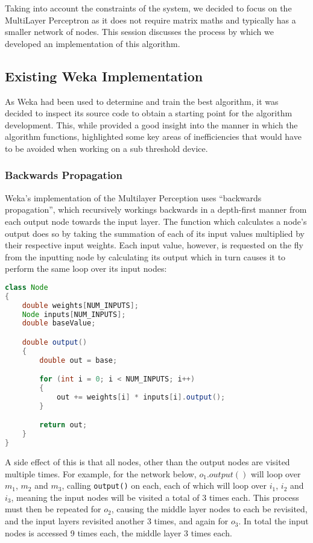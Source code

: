 
Taking into account the constraints of the system, we decided to focus on the MultiLayer Perceptron as it does not require matrix maths and typically has a smaller network of nodes. This session discusses the process by which we developed an implementation of this algorithm.

\subsection{Existing Weka Implementation}

As Weka had been used to determine and train the best algorithm, it was decided to inspect its source code to obtain a starting point for the algorithm development. This, while provided a good insight into the manner in which the algorithm functions, highlighted some key areas of inefficiencies that would have to be avoided when working on a sub threshold device.

\subsubsection{Backwards Propagation}

Weka's implementation of the Multilayer Perception uses ``backwards propagation'', which recursively workings backwards in a depth-first manner from each output node towards the input layer. The function which calculates a node's output does so by taking the summation of each of its input values multiplied by their respective input weights. Each input value, however, is requested on the fly from the inputting node by calculating its output which in turn causes it to perform the same loop over its input nodes:

\begin{lstlisting}[language=Java,caption={Weka's method of calculating a node's output}]
class Node
{
    double weights[NUM_INPUTS];
    Node inputs[NUM_INPUTS];
    double baseValue;

    double output()
    {
        double out = base;

        for (int i = 0; i < NUM_INPUTS; i++)
        {
            out += weights[i] * inputs[i].output();
        }

        return out;
    }
}
\end{lstlisting}

A side effect of this is that all nodes, other than the output nodes are visited multiple times. For example, for the network below, $o_1.output()$ will loop over $m_1$, $m_2$ and $m_3$, calling \verb|output()| on each, each of which will loop over $i_1$, $i_2$ and $i_3$, meaning the input nodes will be visited a total of 3 times each. This process must then be repeated for $o_2$, causing the middle layer nodes to each be revisited, and the input layers revisited another 3 times, and again for $o_3$. In total the input nodes is accessed 9 times each, the middle layer 3 times each.


